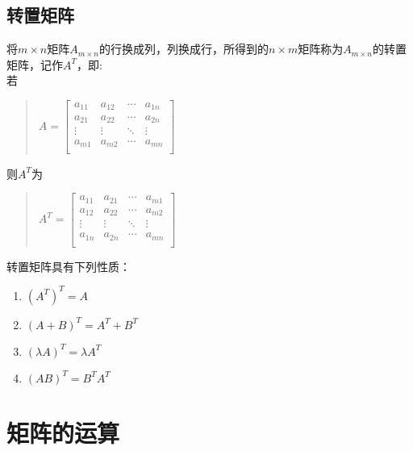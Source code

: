 \documentclass[a4paper,10pt]{article}
\begin{document}
\begin{CJK}{UTF8}{song}
\subsection{转置矩阵}
将$m\times{}n$矩阵$A_{m\times{}n}$的行换成列，列换成行，所得到的$n\times{}m$矩阵称为$A_{m\times{}n}$的转置矩阵，记作$A^{T}$，即: \\
若
\begin{quote}
$A=\left[\begin{array}{cccc}
a_{11}&a_{12}&\cdots{}&a_{1n} \\
a_{21}&a_{22}&\cdots{}&a_{2n} \\
\vdots&\vdots&\ddots{}&\vdots \\
a_{m1}&a_{m2}&\cdots{}&a_{mn} \\          
\end{array}\right] $
\end{quote}
则$A^{T}$为
\begin{quote}
$A^{T}=\left[\begin{array}{cccc}
a_{11}&a_{21}&\cdots{}&a_{m1} \\
a_{12}&a_{22}&\cdots{}&a_{m2} \\
\vdots&\vdots&\ddots{}&\vdots \\
a_{1n}&a_{2n}&\cdots{}&a_{mn} \\          
\end{array}\right] $
\end{quote}
转置矩阵具有下列性质：
\begin{enumerate}
\item $(A^{T})^{T}=A$
\item $(A+B)^{T}=A^{T}+B^{T}$
\item $(\lambda{}A)^{T}=\lambda{}A^{T}$
\item $(AB)^T=B^{T}A^{T}$
\end{enumerate}


\section{矩阵的运算}

\end{CJK}
\end{document}
